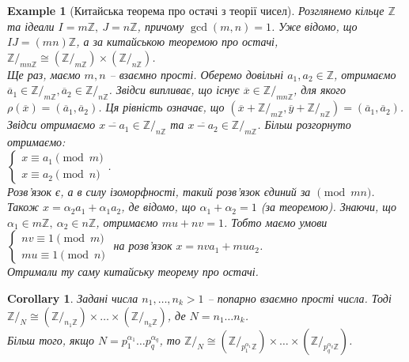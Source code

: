 \documentclass[a4paper, 10pt]{article}
\theoremstyle{theoremdd}
\theoremstyle{theoremdd}
\theoremstyle{theoremdd}
\theoremstyle{theoremdd}
\theoremstyle{theoremdd}
\newtheorem{example}[theorem]{Example}
\theoremstyle{theoremdd}
\theoremstyle{theoremdd}
\theoremstyle{theoremdd}
\theoremstyle{theoremdd}
\theoremstyle{theoremdd}
\theoremstyle{theoremdd}
\theoremstyle{theoremdd}
\theoremstyle{theoremdd}
\theoremstyle{theoremdd}
\newtheorem{corollary}[theorem]{Corollary}
\theoremstyle{theoremdd}
\begin{document}
\begin{example}[Китайська теорема про остачі з теорії чисел]
Розглянемо кільце $\mathbb{Z}$ та ідеали $I = m \mathbb{Z},\ J = n \mathbb{Z}$, причому $\gcd(m,n) = 1$. Уже відомо, що $IJ = (mn) \mathbb{Z}$, а за китайською теоремою про остачі,\\
$\mathbb{Z}/_{mn \mathbb{Z}} \cong (\mathbb{Z}/_{m \mathbb{Z}}) \times (\mathbb{Z}/_{n \mathbb{Z}})$.
\bigskip \\
Ще раз, маємо $m,n$ -- взаємно прості. Оберемо довільні $a_1,a_2 \in \mathbb{Z}$, отримаємо $\overline{a}_1 \in \mathbb{Z}/_{m \mathbb{Z}}, \overline{a}_2 \in \mathbb{Z}/_{n \mathbb{Z}}$. Звідси випливає, що існує $\overline{x} \in \mathbb{Z}/_{ mn \mathbb{Z}}$, для якого $\rho(\overline{x}) = (\overline{a}_1,\overline{a}_2)$. Ця рівність означає, що $(\overline{x} + \mathbb{Z}/_{m \mathbb{Z}}, \overline{y} + \mathbb{Z}/_{n \mathbb{Z}}) = (\overline{a}_1,\overline{a}_2)$. Звідси отримаємо $\overline{x-a_1} \in \mathbb{Z}/_{n \mathbb{Z}}$ та $\overline{x-a_2} \in \mathbb{Z}/_{m \mathbb{Z}}$. Більш розгорнуто отримаємо:\\
$\begin{cases}
x \equiv a_1 \pmod m \\
x \equiv a_2 \pmod n
\end{cases}$.\\
Розв'язок є, а в силу ізоморфності, такий розв'язок єдиний за $\pmod {mn}$.\\
Також $x = \alpha_2 a_1 + \alpha_1 a_2$, де відомо, що $\alpha_1 + \alpha_2 = 1$ (за теоремою). Знаючи, що $\alpha_1 \in m \mathbb{Z},\ \alpha_2 \in n \mathbb{Z}$, отримаємо $mu + nv = 1$. Тобто маємо умови $\begin{cases} nv \equiv 1 \pmod m \\ mu \equiv 1 \pmod n \end{cases}$ на розв'язок $x = nv a_1 + mu a_2$.\\
Отримали ту саму китайську теорему про остачі.
\end{example}

\begin{corollary}
Задані числа $n_1,\dots,n_k > 1$ -- попарно взаємно прості числа. Тоді $\mathbb{Z}/_{N} \cong (\mathbb{Z}/_{n_1 \mathbb{Z}}) \times \dots \times (\mathbb{Z}/_{n_k \mathbb{Z}})$, де $N = n_1 \dots n_k$.\\
Більш того, якщо $N = p_1^{\alpha_1} \dots p_q^{\alpha_q}$, то $\mathbb{Z}/_{N} \cong (\mathbb{Z}/_{p_1^{\alpha_1} \mathbb{Z}}) \times \dots \times (\mathbb{Z}/_{p_q^{\alpha_q} \mathbb{Z}})$.
\end{corollary}
\end{document}
